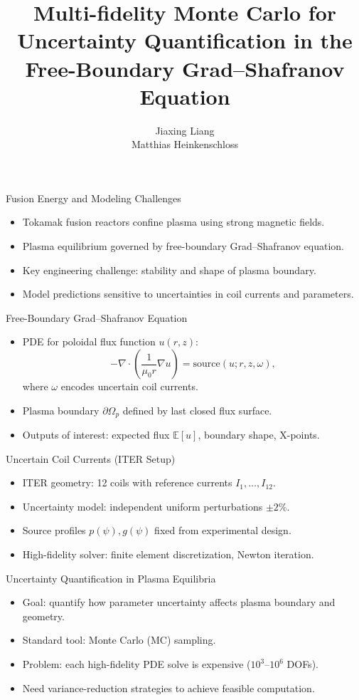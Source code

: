 \documentclass{beamer}
\title[MFMC for Tokamak UQ]{Multi-fidelity Monte Carlo for Uncertainty Quantification in the Free-Boundary Grad–Shafranov Equation}
\author[J.Liang]{\normalsize  Jiaxing Liang\\ Matthias Heinkenschloss}
\institute[Rice University]{\fontsize{8}{8} Department of Computational and Applied Mathematics, Rice University}
\begin{document}
\frame{\titlepage }


\begin{frame}{Fusion Energy and Modeling Challenges}
    \begin{itemize}[leftmargin=5pt] 
        \item Tokamak fusion reactors confine plasma using strong magnetic fields.
        \item Plasma equilibrium governed by free-boundary Grad–Shafranov equation.
        \item Key engineering challenge: stability and shape of plasma boundary.
        \item Model predictions sensitive to uncertainties in coil currents and parameters.
    \end{itemize}
\end{frame}

\begin{frame}{Free-Boundary Grad–Shafranov Equation}
    \begin{itemize}
        \item PDE for poloidal flux function $u(r,z)$:
        \[
        -\nabla \cdot \left( \frac{1}{\mu_0 r} \nabla u \right) = \text{source}(u;r,z,\omega),
        \]
        where $\omega$ encodes uncertain coil currents.
        \item Plasma boundary $\partial \Omega_p$ defined by last closed flux surface.
        \item Outputs of interest: expected flux $\mathbb{E}[u]$, boundary shape, X-points.
    \end{itemize}
\end{frame}


\begin{frame}{Uncertain Coil Currents (ITER Setup)}
    \begin{itemize}
        \item ITER geometry: 12 coils with reference currents $I_1,\ldots,I_{12}$.
        \item Uncertainty model: independent uniform perturbations $\pm 2\%$.
        \item Source profiles $p(\psi), g(\psi)$ fixed from experimental design.
        \item High-fidelity solver: finite element discretization, Newton iteration.
    \end{itemize}
\end{frame}

\begin{frame}{Uncertainty Quantification in Plasma Equilibria}
    \begin{itemize}
        \item Goal: quantify how parameter uncertainty affects plasma boundary and geometry.
        \item Standard tool: Monte Carlo (MC) sampling.
        \item Problem: each high-fidelity PDE solve is expensive ($10^3$--$10^6$ DOFs).
        \item Need variance-reduction strategies to achieve feasible computation.
    \end{itemize}
\end{frame}
\end{document}
